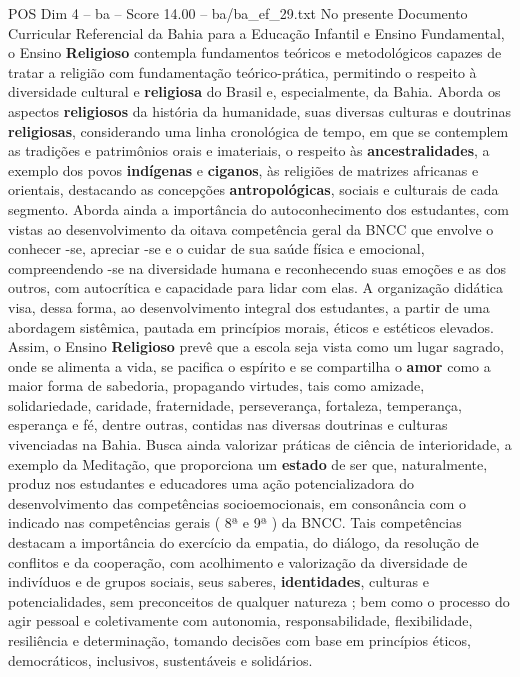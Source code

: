 \begin{textsample}{POS Dim 4 – ba – Score 14.00 – ba/ba\_ef\_29.txt}
No presente Documento Curricular Referencial da Bahia para a Educação Infantil e Ensino Fundamental, o Ensino \textbf{Religioso} contempla fundamentos teóricos e metodológicos capazes de tratar a religião com fundamentação teórico-prática, permitindo o respeito à diversidade cultural e \textbf{religiosa} do Brasil e, especialmente, da Bahia.
Aborda os aspectos \textbf{religiosos} da história da humanidade, suas diversas culturas e doutrinas \textbf{religiosas}, considerando uma linha cronológica de tempo, em que se contemplem as tradições e patrimônios orais e imateriais, o respeito às \textbf{ancestralidades}, a exemplo dos povos \textbf{indígenas} e \textbf{ciganos}, às religiões de matrizes africanas e orientais, destacando as concepções \textbf{antropológicas}, sociais e culturais de cada segmento.
Aborda ainda a importância do autoconhecimento dos estudantes, com vistas ao desenvolvimento da oitava competência geral da BNCC que envolve o conhecer -se, apreciar -se e o cuidar de sua saúde física e emocional, compreendendo -se na diversidade humana e reconhecendo suas emoções e as dos outros, com autocrítica e capacidade para lidar com elas.
A organização didática visa, dessa forma, ao desenvolvimento integral dos estudantes, a partir de uma abordagem sistêmica, pautada em princípios morais, éticos e estéticos elevados.
Assim, o Ensino \textbf{Religioso} prevê que a escola seja vista como um lugar sagrado, onde se alimenta a vida, se pacifica o espírito e se compartilha o \textbf{amor} como a maior forma de sabedoria, propagando virtudes, tais como amizade, solidariedade, caridade, fraternidade, perseverança, fortaleza, temperança, esperança e fé, dentre outras, contidas nas diversas doutrinas e culturas vivenciadas na Bahia.
Busca ainda valorizar práticas de ciência de interioridade, a exemplo da Meditação, que proporciona um \textbf{estado} de ser que, naturalmente, produz nos estudantes e educadores uma ação potencializadora do desenvolvimento das competências socioemocionais, em consonância com o indicado nas competências gerais ( 8ª e 9ª ) da BNCC.
Tais competências destacam a importância do exercício da empatia, do diálogo, da resolução de conflitos e da cooperação, com acolhimento e valorização da diversidade de indivíduos e de grupos sociais, seus saberes, \textbf{identidades}, culturas e potencialidades, sem preconceitos de qualquer natureza ; bem como o processo do agir pessoal e coletivamente com autonomia, responsabilidade, flexibilidade, resiliência e determinação, tomando decisões com base em princípios éticos, democráticos, inclusivos, sustentáveis e solidários.

\end{textsample}
